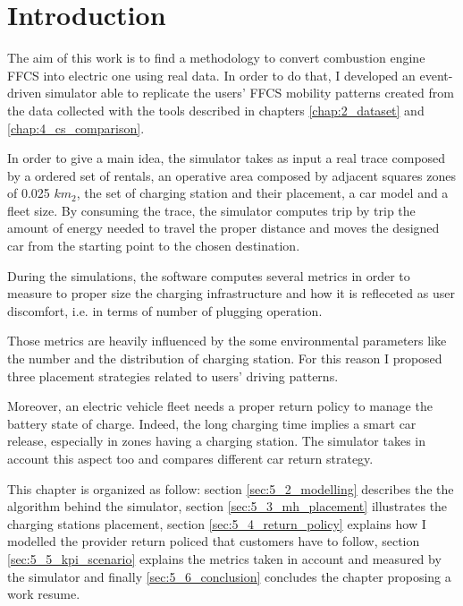 \section{Introduction}
The aim of this work is to find a methodology to convert combustion engine FFCS into electric one using real data. In order to do that,  I developed an event-driven simulator able to replicate the users' FFCS mobility patterns created from the data collected with the tools described in chapters \ref{chap:2_dataset} and \ref{chap:4_cs_comparison}. 

In order to give a main idea, the simulator takes as input a real trace composed by a ordered set of rentals, an operative area composed by adjacent squares zones of 0.025 $km_2$, the set of charging station and their placement, a car model and a fleet size. By consuming the trace, the simulator computes trip by trip the amount of energy needed to travel the proper distance and moves the designed car from the starting point to the chosen destination.

During the simulations, the software computes several metrics in order to measure to proper size the charging infrastructure and how it is refleceted as user discomfort, i.e. in terms of number of plugging operation.

Those metrics are heavily influenced by the some environmental parameters like the number and the distribution of charging station. For this reason I proposed three placement strategies related to users' driving patterns. 

Moreover, an electric vehicle fleet needs a proper return policy to manage the battery state of charge. Indeed, the long charging time implies a smart car release, especially in zones having a charging station. The simulator takes in account this aspect too and compares different car return strategy.

This chapter is organized as follow: section \ref{sec:5_2_modelling} describes the the algorithm behind the simulator, section \ref{sec:5_3_mh_placement} illustrates the charging stations placement, section \ref{sec:5_4_return_policy} explains how I modelled the provider return policed that customers have to follow, section \ref{sec:5_5_kpi_scenario} explains the metrics taken in account and measured by the simulator and finally \ref{sec:5_6_conclusion} concludes the chapter proposing a work resume.